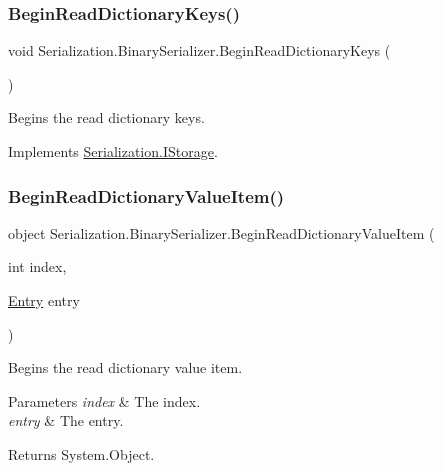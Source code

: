 \subsubsection{\texorpdfstring{Begin\+Read\+Dictionary\+Keys()}{BeginReadDictionaryKeys()}}
{\footnotesize\ttfamily void Serialization.\+Binary\+Serializer.\+Begin\+Read\+Dictionary\+Keys (\begin{DoxyParamCaption}{ }\end{DoxyParamCaption})\hspace{0.3cm}{\ttfamily [inline]}}



Begins the read dictionary keys. 



Implements \hyperlink{interface_serialization_1_1_i_storage_ae44889714fb24b498bae004a9e6890ee}{Serialization.\+I\+Storage}.

\mbox{\label{class_serialization_1_1_binary_serializer_afd286629a7b6d4be74e344f7b692ce4d}} 
\subsubsection{\texorpdfstring{Begin\+Read\+Dictionary\+Value\+Item()}{BeginReadDictionaryValueItem()}}
{\footnotesize\ttfamily object Serialization.\+Binary\+Serializer.\+Begin\+Read\+Dictionary\+Value\+Item (\begin{DoxyParamCaption}\item[{int}]{index,  }\item[{\hyperlink{class_serialization_1_1_entry}{Entry}}]{entry }\end{DoxyParamCaption})\hspace{0.3cm}{\ttfamily [inline]}}



Begins the read dictionary value item. 


\begin{DoxyParams}{Parameters}
{\em index} & The index.\\
\hline
{\em entry} & The entry.\\
\hline
\end{DoxyParams}
\begin{DoxyReturn}{Returns}
System.\+Object.
\end{DoxyReturn}



